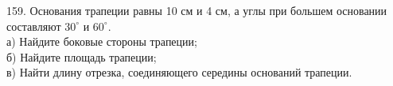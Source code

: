 159. Основания трапеции равны 10 см и 4 см, а углы при большем основании составляют $30^\circ$ и $60^\circ.$\\
а) Найдите боковые стороны трапеции;\\
б) Найдите площадь трапеции;\\
в) Найти длину отрезка, соединяющего середины оснований трапеции.\\

